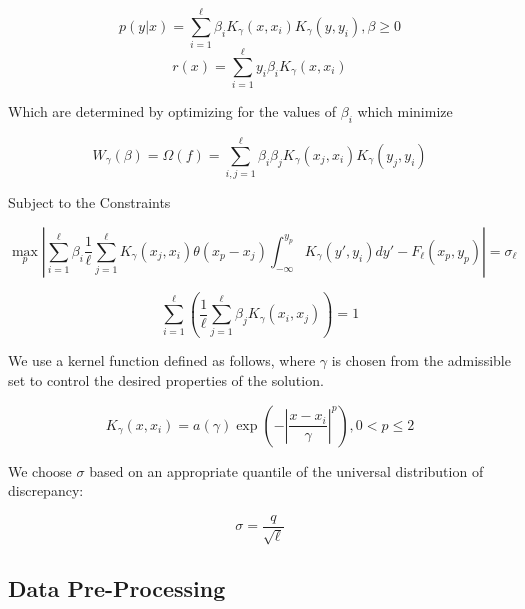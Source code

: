 \documentclass[10pt]{article}
\begin{document}
\begin{equation} p(y|x) = \sum_{i=1}^\ell \beta_i K_\gamma(x,x_i) K_\gamma(y,y_i) , \beta \ge 0 \end{equation}
\begin{equation} r(x) = \sum_{i=1}^\ell y_i \beta_i K_\gamma(x,x_i) \end{equation}

Which are determined by optimizing for the values of \( \beta_i \) which minimize

\begin{equation} W_\gamma(\beta) = \Omega(f) = \sum_{i,j=1}^\ell \beta_i \beta_j K_\gamma(x_j,x_i) K_\gamma(y_j,y_i) \end{equation}

Subject to the Constraints

\begin{equation} \max_p \left | \sum_{i=1}^\ell \beta_i \frac{1}{\ell} \sum_{j=1}^\ell K_\gamma(x_j,x_i)\theta(x_p-x_j) \int_{-\infty}^{y_p} K_\gamma(y',y_i)dy' - F_\ell(x_p,y_p) \right | = \sigma_\ell \end{equation}

\begin{equation} \sum_{i=1}^\ell \left ( \frac{1}{\ell} \sum_{j=1}^\ell \beta_j K_\gamma(x_i,x_j) \right ) = 1 \end{equation}

We use a kernel function defined as follows, where \( \gamma \) is chosen from the admissible set to control the desired properties of the solution.

\begin{equation} K_\gamma(x,x_i) = a(\gamma) \exp \left ( - \left | \frac{x-x_i}{\gamma} \right | ^p \right ) , 0 < p \le 2 \end{equation}

We choose \( \sigma \) based on an appropriate quantile of the universal distribution of discrepancy:

\begin{equation} \sigma = \frac{q}{\sqrt \ell} \end{equation}

\subsection{Data Pre-Processing}

\end{document}
